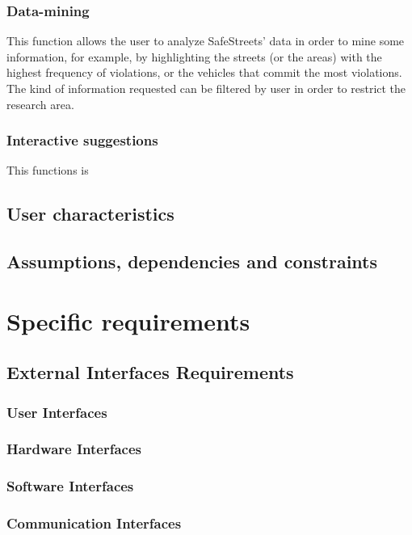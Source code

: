 \documentclass{article}
\begin{document}
        \subsubsection{Data-mining}
        This function allows the user to analyze SafeStreets' data in order to mine some information, for example, by highlighting the streets (or the areas) with the highest frequency of violations, or the vehicles that commit the most violations. The kind of information requested can be filtered by user in order to restrict the research area. \\
        
        \subsubsection{Interactive suggestions}
        This functions is 
    
        \subsection{User characteristics}
        \subsection{Assumptions, dependencies and constraints}
        
        
    \section{Specific requirements}
        \subsection{External Interfaces Requirements}
            \subsubsection{User Interfaces}
            \subsubsection{Hardware Interfaces}
            \subsubsection{Software Interfaces}
            \subsubsection{Communication Interfaces}
\end{document}
